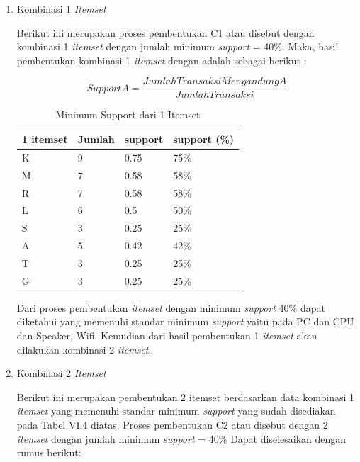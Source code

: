 \begin{enumerate}
\item Kombinasi 1 \textit{Itemset}
\par Berikut ini merupakan proses pembentukan C1 atau disebut dengan kombinasi 1 \textit{itemset} dengan jumlah minimum \textit{support} = 40\%. Maka, hasil pembentukan kombinasi 1 \textit{itemset} dengan  adalah sebagai berikut :

\begin{equation}
    Support A =\frac{Jumlah Transaksi Mengandung A}{Jumlah Transaksi} 
    \end{equation}

\begin{table}[!ht]
\caption{Minimum Support dari 1 Itemset}
\begin{center}
\begin{tabular}{|l|l|l|l|}
\hline
1 itemset & Jumlah & support & support (\%) \\ \hline
K         & 9      & 0.75    & 75\%         \\ \hline
M         & 7      & 0.58    & 58\%         \\ \hline
R         & 7      & 0.58    & 58\%         \\ \hline
L         & 6      & 0.5     & 50\%         \\ \hline
S         & 3      & 0.25    & 25\%         \\ \hline
A         & 5      & 0.42    & 42\%         \\ \hline
T         & 3      & 0.25    & 25\%         \\ \hline
G         & 3      & 0.25    & 25\%         \\ \hline
\end{tabular}
\end{center}
\end{table}

\par Dari proses pembentukan \textit{itemset} dengan minimum \textit{support} 40\% dapat diketahui yang memenuhi standar minimum \textit{support} yaitu pada PC dan CPU dan Speaker, Wifi. Kemudian dari hasil pembentukan 1 \textit{itemset} akan dilakukan kombinasi 2 \textit{itemset}.

\item Kombinasi  2 \textit{Itemset}
\par Berikut ini merupakan pembentukan 2 itemset berdasarkan data kombinasi 1 \textit{itemset}  yang memenuhi standar minimum \textit{support} yang sudah disediakan pada Tabel VI.4 diatas. Proses pembentukan C2 atau disebut dengan 2 \textit{itemset} dengan jumlah minimum \textit{support} = 40\% Dapat diselesaikan dengan rumus berikut:


\end{enumerate}
